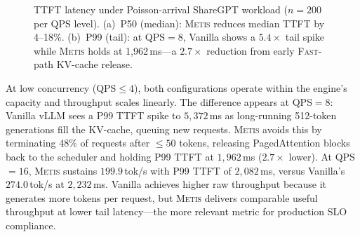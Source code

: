 \documentclass[11pt,a4paper]{article}
\newcommand{\metis}{\textsc{Metis}}
\begin{document}
\begin{figure}[ht]
\centering
{}
\caption{TTFT latency under Poisson-arrival ShareGPT workload ($n{=}200$ per QPS level). (a)~P50 (median): \metis{} reduces median TTFT by 4--18\%. (b)~P99 (tail): at QPS${=}8$, Vanilla shows a $5.4\times$ tail spike while \metis{} holds at 1{,}962\,ms---a $2.7\times$ reduction from early \textsc{Fast}-path KV-cache release.}
\label{fig:latency}
\end{figure}

At low concurrency (QPS${\leq}4$), both configurations operate within the engine's capacity and throughput scales linearly. The difference appears at QPS${=}8$: Vanilla vLLM sees a P99 TTFT spike to $5{,}372$\,ms as long-running 512-token generations fill the KV-cache, queuing new requests. \metis{} avoids this by terminating 48\% of requests after $\leq 50$ tokens, releasing PagedAttention blocks back to the scheduler and holding P99 TTFT at $1{,}962$\,ms ($2.7\times$ lower). At QPS${=}16$, \metis{} sustains $199.9$\,tok/s with P99 TTFT of $2{,}082$\,ms, versus Vanilla's $274.0$\,tok/s at $2{,}232$\,ms. Vanilla achieves higher raw throughput because it generates more tokens per request, but \metis{} delivers comparable useful throughput at lower tail latency---the more relevant metric for production SLO compliance.
\end{document}
